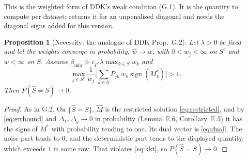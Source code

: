 \documentclass[11pt,a4paper]{article}
\numberwithin{equation}{section}
\theoremstyle{plain}
\newtheorem{proposition}[theorem]{Proposition}
\theoremstyle{remark}
\DeclareMathOperator{\sign}{sign}
\begin{document}
This is the weighted form of DDK's weak condition (G.1). It is the quantity to compute per dataset;  returns it for an unpenalised diagonal and needs the diagonal signs added for this version.

\begin{proposition}[Necessity; the analogue of DDK Prop.~G.2]\label{prop:W5}
Let $\lambda>0$ be fixed and let the weights converge in probability, $\hat w\to w$, with $0<w_j<\infty$ on $S^c$ and $w<\infty$ on $S$. Assume $\beta_{\min}>c_{\Gamma^*}\lambda\max_{k\in S}w_k$ and
\[
\max_{j\in S^c}\frac{1}{w_j}\Big|\sum_{k\in S}P_{jk}\,w_k\sign(M^*_k)\Big|>1 .
\]
Then $P(\hat S=S)\to0$.
\end{proposition}

\begin{proof}
As in G.2. On $\{\hat S=S\}$, $\hat M$ is the restricted solution \eqref{eq:restricted}, and by \eqref{eq:errbound} and $\Delta_\Gamma,\Delta_g\to0$ in probability (Lemma~E.6, Corollary~E.5) it has the signs of $M^*$ with probability tending to one. Its dual vector is \eqref{eq:dual}. The noise part tends to $0$, and the deterministic part tends to the displayed quantity, which exceeds $1$ in some row. That violates \eqref{eq:kkt}, so $P(\hat S=S)\to0$.
\end{proof}
\end{document}
